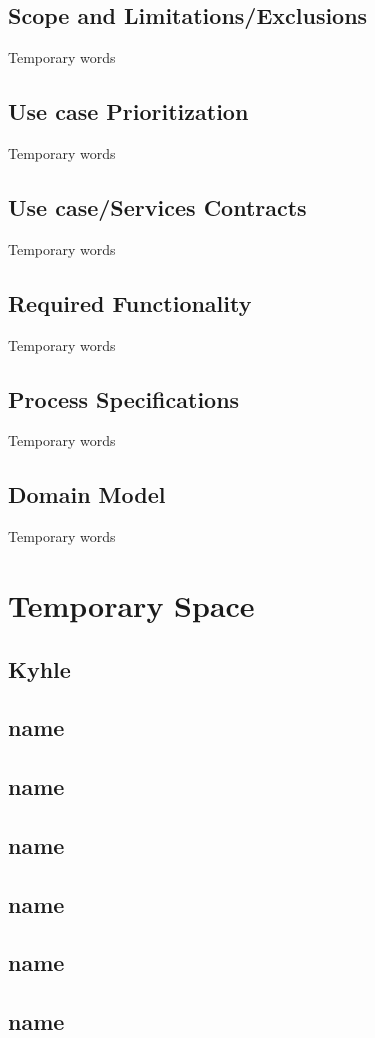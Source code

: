 \documentclass[11pt]{article}
\begin{document}
\subsection{Scope and Limitations/Exclusions}
Temporary words
\subsection{Use case Prioritization}
Temporary words
\subsection{Use case/Services Contracts}
Temporary words
\subsection{Required Functionality}
Temporary words
\subsection{Process Specifications}
Temporary words
\subsection{Domain Model}
Temporary words
\section{Temporary Space}
\subsection{Kyhle}
\subsection{name}
\subsection{name}
\subsection{name}
\subsection{name}
\subsection{name}
\subsection{name}
\end{document}
